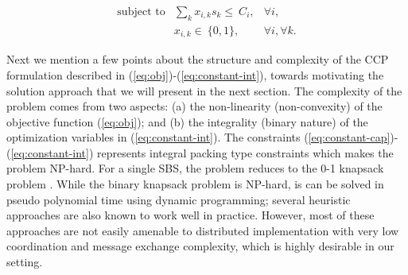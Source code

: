 \documentclass[conference]{IEEEtran}
\begin{document}
\vspace{-0.1in}
\begin{eqnarray}
\mbox{subject to} & \sum_k x_{i,k} s_k  \leq \  C_i, & \forall i, \label{eq:constant-cap}\\
& x_{i,k} \in \  \{0,1\}, & \forall i, \forall k. \label{eq:constant-int}
\end{eqnarray}






Next we mention a few points about the structure and complexity of the CCP formulation described in (\ref{eq:obj})-(\ref{eq:constant-int}), towards motivating the solution approach that we will present in the next section. The complexity of the problem comes from two aspects: (a) the non-linearity (non-convexity) of the objective function (\ref{eq:obj}); and (b) the integrality (binary nature) of the optimization variables in (\ref{eq:constant-int}). The constraints (\ref{eq:constant-cap})-(\ref{eq:constant-int}) represents integral packing type constraints which makes the problem NP-hard. For a single SBS, the problem reduces to the 0-1 knapsack problem \cite{10.5555/98124}. While the binary knapsack problem is NP-hard, is can be solved in pseudo polynomial time using dynamic programming; several heuristic approaches are also known to work well in practice. However, most of these approaches are not easily amenable to distributed implementation with very low coordination and message exchange complexity, which is highly desirable in our setting. 
\end{document}
